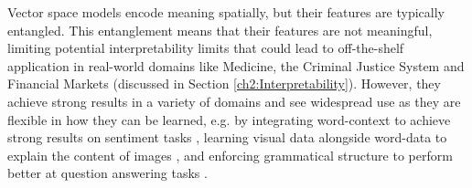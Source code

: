 


%





Vector space models encode meaning spatially, but their features are typically entangled. This entanglement means that their features are not meaningful, limiting potential interpretability limits that could lead to off-the-shelf application in real-world domains like Medicine, the Criminal Justice System and Financial Markets (discussed in Section \ref{ch2:Interpretability}). However, they achieve strong results in a variety of domains and see widespread use as they  are flexible in how they can be learned, e.g. by integrating word-context  to achieve strong results on sentiment tasks \cite{Pennington2014}, learning visual data alongside word-data to explain the content of images \cite{Mao2014a}, and enforcing grammatical structure to perform better at question answering tasks \cite{Palangi2017}. 

